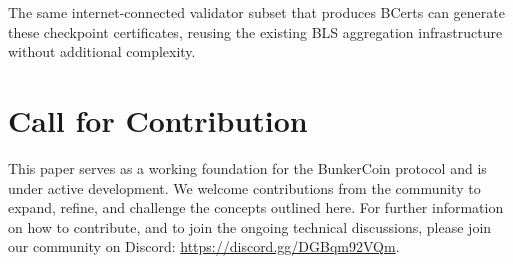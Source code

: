 \documentclass{article}
\begin{document}
The same internet-connected validator subset that produces BCerts can generate these checkpoint certificates, reusing the existing BLS aggregation infrastructure without additional complexity.
\section{Call for Contribution}

This paper serves as a working foundation for the BunkerCoin protocol and is under active development. We welcome contributions from the community to expand, refine, and challenge the concepts outlined here. For further information on how to contribute, and to join the ongoing technical discussions, please join our community on Discord: \url{https://discord.gg/DGBqm92VQm}.
\end{document}

